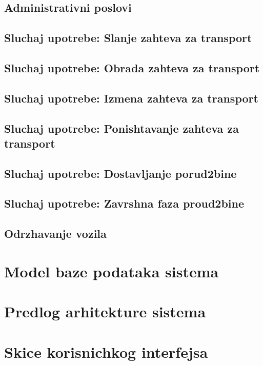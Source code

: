 \documentclass{article}
\begin{document}
\subsection{Administrativni poslovi}



\subsection{Sluchaj upotrebe: Slanje zahteva za transport}


\subsection{Sluchaj upotrebe: Obrada zahteva za transport}


\subsection{Sluchaj upotrebe: Izmena zahteva za transport}


\subsection{Sluchaj upotrebe: Ponishtavanje zahteva za transport}


\subsection{Sluchaj upotrebe: Dostavljanje porud2bine}

\subsection{Sluchaj upotrebe: Zavrshna faza proud2bine}


\subsection{Odrzhavanje vozila}



\section{Model baze podataka sistema}


\section{Predlog arhitekture sistema}


\section{Skice korisnichkog interfejsa}


\newpage

\nocite{*}
\selectfont



\end{document}
